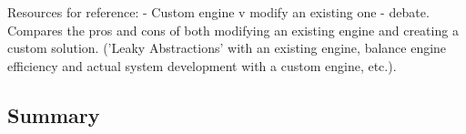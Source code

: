 		Resources for reference:
		\cite{Bruce2012} - Custom engine v modify an existing one - debate. Compares the pros and cons of both modifying an existing engine and creating a custom solution. ('Leaky Abstractions' with an existing engine, balance engine efficiency and actual system development with a custom engine, etc.).
		
	\subsection{Summary}
	\label{lr:cross:conclusion}

